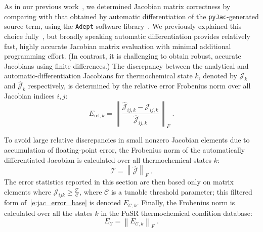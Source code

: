 \documentclass[12pt,number,sort&compress,preprint]{elsarticle}
\newcommand{\revise}[1]{{\sloppy\textcolor{RoyalPurple}{#1}}}  %
\begin{document}
As in our previous work~\cite{Niemeyer:2016aa}, we determined Jacobian matrix correctness by comparing with that obtained by automatic differentiation of the \texttt{pyJac}-generated source term, using the \texttt{Adept} software library~\cite{adept-v11,hogan2014fast}.
We previously explained this choice fully~\cite{Niemeyer:2016aa}, but broadly speaking automatic differentiation provides relatively fast, highly accurate Jacobian matrix evaluation with minimal additional programming effort.
\revise{(In contrast, it is challenging to obtain robust, accurate Jacobians using finite differences.)}
The discrepancy between the analytical and automatic-differentiation Jacobians for thermochemical state $k$, denoted by $\mathcal{J}_k$ and $\hat{\mathcal{J}}_k$ respectively, is determined by the relative error Frobenius norm over all Jacobian indices $i, j$:
\begin{equation}
 \label{e:jac_error_base}
 E_{\text{rel}, k} = \left\lVert \frac{\hat{\mathcal{J}}_{ij,k} - \mathcal{J}_{ij,k}}{\hat{\mathcal{J}}_{ij,k}} \right\rVert_{F} \;.
\end{equation}

To avoid large relative discrepancies in small nonzero Jacobian elements due to accumulation of floating-point error, the Frobenius norm of the automatically differentiated Jacobian is calculated over all thermochemical states $k$:
\begin{equation}
 \label{e:thresh}
 \mathcal{T} = \left\lVert \mathcal{\hat{J}} \right\rVert_{F} \;.
\end{equation}
The error statistics reported in this section are then based only on matrix elements where $\mathcal{J}_{ijk} \ge \frac{\mathcal{T}}{\mathcal{C}}$, where $\mathcal{C}$ is \revise{a tunable} threshold parameter; this filtered form of~\cref{e:jac_error_base} is denoted $E_{\mathcal{C},k}$.
Finally, the Frobenius norm is calculated over all the states $k$ in the PaSR thermochemical condition database:
\begin{equation}
 \label{e:thresholded_error}
 E_{\mathcal{C}} = \left\lVert E_{\mathcal{C},k} \right\rVert_{F} \;.
\end{equation}
\end{document}
